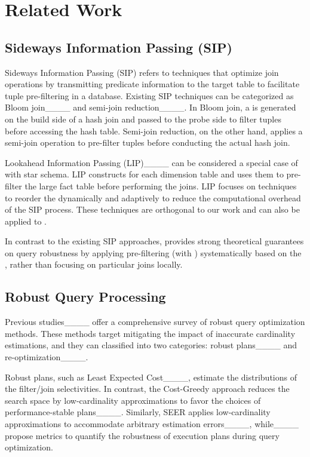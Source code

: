 \section{Related Work}
\label{sec:related}

\subsection{Sideways Information Passing (SIP)}

Sideways Information Passing (SIP) refers to techniques that optimize join operations by transmitting predicate information to the target table to facilitate tuple pre-filtering in a database. Existing SIP techniques can be categorized as Bloom join____ and semi-join reduction____. In Bloom join, a \BF is generated on the build side of a hash join and passed to the probe side to filter tuples before accessing the hash table. Semi-join reduction, on the other hand, applies a semi-join operation to pre-filter tuples before conducting the actual hash join.

Lookahead Information Passing (LIP)____ can be considered a special case of \RPT with star schema. LIP constructs \BFs for each dimension table and uses them to pre-filter the large fact table before performing the joins. LIP focuses on techniques to reorder the \BFs dynamically and adaptively to reduce the computational overhead of the SIP process. These techniques are orthogonal to our work and can also be applied to \rpt.

In contrast to the existing SIP approaches, \RPT provides strong theoretical guarantees on query robustness by applying pre-filtering (with \BFs) systematically based on the \YannAlg, rather than focusing on particular joins locally.

\subsection{Robust Query Processing}

Previous studies____ offer a comprehensive survey of robust query optimization methods. These methods target mitigating the impact of inaccurate cardinality estimations, and they can classified into two categories: robust plans____ and re-optimization____.

Robust plans, such as Least Expected Cost____, estimate the distributions of the filter/join selectivities. In contrast, the Cost-Greedy approach reduces the search space by low-cardinality approximations to favor the choices of performance-stable plans____. Similarly, SEER applies low-cardinality approximations to accommodate arbitrary estimation errors____, while____ propose metrics to quantify the robustness of execution plans during query optimization.

